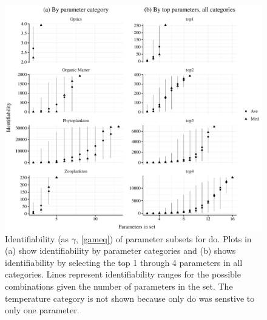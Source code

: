 \documentclass[letterpaper,12pt,oneside]{article}\usepackage[]{graphicx}\usepackage[]{color}
\makeatletter
\def\maxwidth{ %
  \ifdim\Gin@nat@width>\linewidth
    \linewidth
  \else
    \Gin@nat@width
  \fi
}
\makeatother
\begin{document}
\begin{figure}[!ht]

{\centering \includegraphics[width=\maxwidth]{figs/identbox-1} 

}

\caption{Identifiability (as $\gamma$, \cref{gameq}) of parameter subsets for \ac{do}.  Plots in (a) show identifiability by parameter categories and (b) shows identifiability by selecting the top 1 through 4 parameters in all categories.  Lines represent identifiability ranges for the possible combinations given the number of parameters in the set.  The temperature category is not shown because only \ac{do} was senstive to only one parameter.}\label{fig:identbox}
\end{figure}
\end{document}
